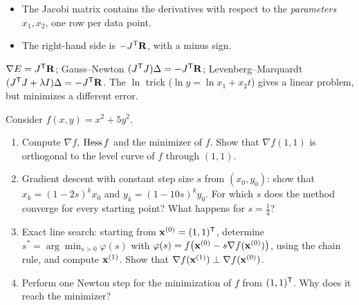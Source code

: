 \begin{solution}
\begin{trap}
\begin{itemize}
\item The Jacobi matrix contains the derivatives with respect to the \emph{parameters} $x_1,x_2$, one row per data point.
\item The right-hand side is $-J^{\mathsf{T}}\mathbf{R}$, with a minus sign.
\end{itemize}
\end{trap}
\begin{heart}
$\nabla E=J^{\mathsf{T}}\mathbf{R}$; Gauss--Newton $(J^{\mathsf{T}} J)\Delta=-J^{\mathsf{T}}\mathbf{R}$; Levenberg--Marquardt $(J^{\mathsf{T}} J+\lambda I)\Delta=-J^{\mathsf{T}}\mathbf{R}$. The $\ln$ trick ($\ln y=\ln x_1+x_2t$) gives a linear problem, but minimizes a different error.
\end{heart}
\end{solution}

Consider $f(x,y)=x^2+5y^2$.
\begin{enumerate}
\item Compute $\nabla f$, $\operatorname{Hess} f$ and the minimizer of $f$. Show that $\nabla f(1,1)$ is orthogonal to the level curve of $f$ through $(1,1)$.
\item Gradient descent with constant step size $s$ from $(x_0,y_0)$: show that $x_k=(1-2s)^kx_0$ and $y_k=(1-10s)^ky_0$. For which $s$ does the method converge for every starting point? What happens for $s=\frac14$?
\item Exact line search: starting from $\mathbf{x}^{(0)}=(1,1)^{\mathsf{T}}$, determine $s^*=\arg\min_{s>0}\varphi(s)$ with $\varphi(s)=f\big(\mathbf{x}^{(0)}-s\nabla f(\mathbf{x}^{(0)})\big)$, using the chain rule, and compute $\mathbf{x}^{(1)}$. Show that $\nabla f(\mathbf{x}^{(1)})\perp\nabla f(\mathbf{x}^{(0)})$.
\item Perform one Newton step for the minimization of $f$ from $(1,1)^{\mathsf{T}}$. Why does it reach the minimizer?
\end{enumerate}

